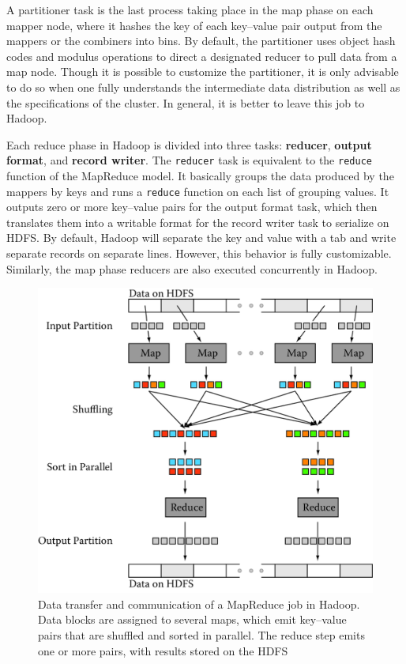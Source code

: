 \documentclass[]{krantz}
\begin{document}
A partitioner task is the last process taking place in the map phase on
each mapper node, where it hashes the key of each key--value pair output
from the mappers or the combiners into bins. By default, the partitioner
uses object hash codes and modulus operations to direct a designated
reducer to pull data from a map node. Though it is possible to customize
the partitioner, it is only advisable to do so when one fully
understands the intermediate data distribution as well as the
specifications of the cluster. In general, it is better to leave this
job to Hadoop.

Each reduce phase in Hadoop is divided into three tasks:
\textbf{reducer}, \textbf{output format}, and \textbf{record writer}.
The \texttt{reducer} task is equivalent to the \texttt{reduce} function
of the MapReduce model. It basically groups the data produced by the
mappers by keys and runs a \texttt{reduce} function on each list of
grouping values. It outputs zero or more key--value pairs for the output
format task, which then translates them into a writable format for the
record writer task to serialize on HDFS. By default, Hadoop will
separate the key and value with a tab and write separate records on
separate lines. However, this behavior is fully customizable. Similarly,
the map phase reducers are also executed concurrently in Hadoop.

\begin{figure}

{\centering \includegraphics[width=0.7\linewidth]{ChapterParallel/figures/hadoop} 

}

\caption{Data transfer and communication of a MapReduce job in Hadoop. Data blocks are assigned to several maps, which emit key--value pairs that are shuffled and sorted in parallel. The reduce step emits one or more pairs, with results stored on the HDFS}\label{fig:hadoop}
\end{figure}
\end{document}
